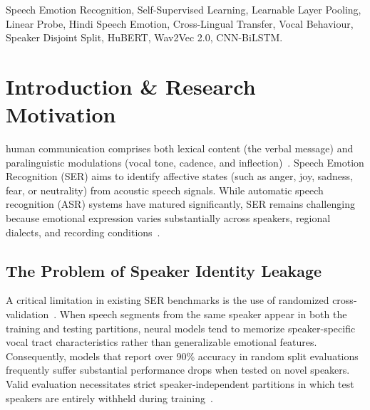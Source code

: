 \documentclass[10pt,journal,compsoc]{IEEEtran}
\begin{document}
{\begin{abstract}
Additionally, cross-lingual transfer from the English multi-corpus foundation model yields 27.62\% accuracy and 31.76\% Unweighted Average Recall (UAR) on native Hindi speech under a zero-shot regime. Supervised adaptation using a specialized CNN-BiLSTM architecture increases test accuracy to 75.19\% and UAR to 70.56\%. Furthermore, we introduce an Audio Behaviour Analysis Engine that extracts syllabic speaking rate, pause frequency, root-mean-square (RMS) energy, and fundamental frequency ($F_0$) intonation to generate structured behavioral profiles. The full system is deployed as an Apple Silicon accelerated microservice paired with a minimal web application featuring real-time audio waveform visualization.
\end{abstract}

\begin{IEEEkeywords}
Speech Emotion Recognition, Self-Supervised Learning, Learnable Layer Pooling, Linear Probe, Hindi Speech Emotion, Cross-Lingual Transfer, Vocal Behaviour, Speaker Disjoint Split, HuBERT, Wav2Vec 2.0, CNN-BiLSTM.
\end{IEEEkeywords}}

\maketitle
\IEEEdisplaynontitleabstractindextext
\IEEEpeerreviewmaketitle

\section{Introduction \& Research Motivation}
\label{sec:intro}

 human communication comprises both lexical content (the verbal message) and paralinguistic modulations (vocal tone, cadence, and inflection)~\cite{ma2024emotion2vec, akcay2020speech}. Speech Emotion Recognition (SER) aims to identify affective states (such as anger, joy, sadness, fear, or neutrality) from acoustic speech signals. While automatic speech recognition (ASR) systems have matured significantly, SER remains challenging because emotional expression varies substantially across speakers, regional dialects, and recording conditions~\cite{kotian2026evaluating, schuller2020interspeech}.

\subsection{The Problem of Speaker Identity Leakage}
A critical limitation in existing SER benchmarks is the use of randomized cross-validation~\cite{wang2025speech, akcay2020speech}. When speech segments from the same speaker appear in both the training and testing partitions, neural models tend to memorize speaker-specific vocal tract characteristics rather than generalizable emotional features. Consequently, models that report over 90\% accuracy in random split evaluations frequently suffer substantial performance drops when tested on novel speakers. Valid evaluation necessitates strict speaker-independent partitions in which test speakers are entirely withheld during training~\cite{hashem2023cross, sun2024combining}.
\end{document}
